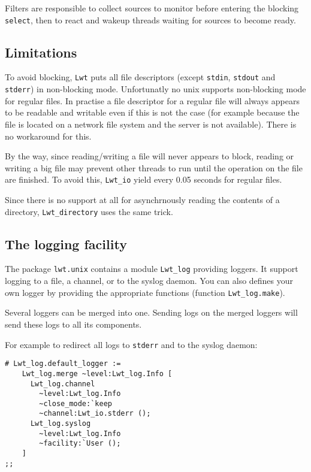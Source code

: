 \documentclass{article}
\newcommand{\lwt}{\texttt{Lwt}\xspace}
\begin{document}
Filters are responsible to collect sources to monitor before entering
the blocking \texttt{select}, then to react and wakeup threads waiting
for sources to become ready.

\subsection{Limitations}

To avoid blocking, \lwt puts all file descriptors (except
\texttt{stdin}, \texttt{stdout} and \texttt{stderr}) in non-blocking
mode. Unfortunatly no unix supports non-blocking mode for regular
files. In practise a file descriptor for a regular file will always
appears to be readable and writable even if this is not the case (for
example because the file is located on a network file system and the
server is not available). There is no workaround for this.

By the way, since reading/writing a file will never appears to block,
reading or writing a big file may prevent other threads to run until
the operation on the file are finished. To avoid this,
\texttt{Lwt\_io} yield every 0.05 seconds for regular files.

Since there is no support at all for asynchrnously reading the
contents of a directory, \texttt{Lwt\_directory} uses the same trick.

\subsection{The logging facility}
\label{lwt.log}

The package \texttt{lwt.unix} contains a module \texttt{Lwt\_log}
providing loggers. It support logging to a file, a channel, or to the
syslog daemon. You can also defines your own logger by providing the
appropriate functions (function \texttt{Lwt\_log.make}).

Several loggers can be merged into one. Sending logs on the merged
loggers will send these logs to all its components.

For example to redirect all logs to \texttt{stderr} and to the syslog
daemon:

\begin{verbatim}
# Lwt_log.default_logger :=
    Lwt_log.merge ~level:Lwt_log.Info [
      Lwt_log.channel
        ~level:Lwt_log.Info
        ~close_mode:`keep
        ~channel:Lwt_io.stderr ();
      Lwt_log.syslog
        ~level:Lwt_log.Info
        ~facility:`User ();
    ]
;;
\end{verbatim}
\end{document}
